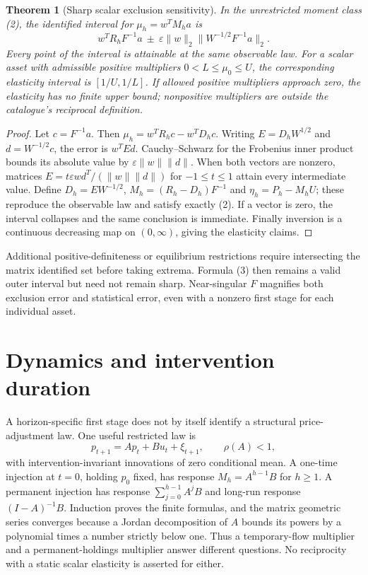 \documentclass[11pt]{article}
\newtheorem{theorem}{Theorem}
\theoremstyle{remark}
\begin{document}
\begin{theorem}[Sharp scalar exclusion sensitivity]
In the unrestricted moment class (2), the identified interval for
$\mu_h=w^TM_ha$ is
\[
 w^TR_hF^{-1}a\ \mathbin{\pm}\
 \varepsilon\|w\|_2\|W^{-1/2}F^{-1}a\|_2.                         \tag{3}
\]
Every point of the interval is attainable at the same observable law.
For a scalar asset with admissible positive multipliers
$0<L\leq\mu_0\leq U$, the corresponding elasticity interval is
$[1/U,1/L]$. If allowed positive multipliers approach zero, the elasticity
has no finite upper bound; nonpositive multipliers are outside the
catalogue's reciprocal definition.
\end{theorem}
\begin{proof}
Let $c=F^{-1}a$. Then $\mu_h=w^TR_hc-w^TD_hc$.
Writing $E=D_hW^{1/2}$ and $d=W^{-1/2}c$, the error is
$w^TEd$. Cauchy--Schwarz for the Frobenius inner product bounds its
absolute value by $\varepsilon\|w\|\|d\|$. When both vectors are
nonzero, matrices
$E=t\varepsilon wd^T/(\|w\|\|d\|)$ for $-1\leq t\leq1$
attain every intermediate value. Define $D_h=EW^{-1/2}$,
$M_h=(R_h-D_h)F^{-1}$ and $\eta_h=P_h-M_hU$; these reproduce the
observable law and satisfy exactly (2). If a vector is zero, the interval
collapses and the same conclusion is immediate. Finally inversion is a
continuous decreasing map on $(0,\infty)$, giving the elasticity claims.
\end{proof}
Additional positive-definiteness or equilibrium restrictions require
intersecting the matrix identified set before taking extrema. Formula (3)
then remains a valid outer interval but need not remain sharp. Near-singular
$F$ magnifies both exclusion error and statistical error, even with a
nonzero first stage for each individual asset.

\section{Dynamics and intervention duration}
A horizon-specific first stage does not by itself identify a structural
price-adjustment law. One useful restricted law is
\[
 p_{t+1}=Ap_t+Bu_t+\xi_{t+1},\qquad \rho(A)<1,
\]
with intervention-invariant innovations of zero conditional mean.
A one-time injection at $t=0$, holding $p_0$ fixed, has response
$M_h=A^{h-1}B$ for $h\geq1$. A permanent injection has response
$\sum_{j=0}^{h-1}A^jB$ and long-run response $(I-A)^{-1}B$.
Induction proves the finite formulas, and the matrix geometric series
converges because a Jordan decomposition of $A$ bounds its powers by a
polynomial times a number strictly below one. Thus a temporary-flow
multiplier and a permanent-holdings multiplier answer different questions.
No reciprocity with a static scalar elasticity is asserted for either.
\end{document}
